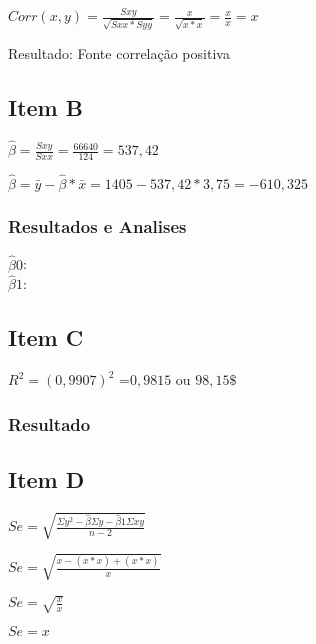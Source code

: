 \documentclass{article}
\begin{document}
\begin{flushleft}
    $Corr(x,y) = \frac{Sxy}{\sqrt{Sxx * Syy}} = \frac{x}{\sqrt{x * x}} = \frac{x}{x} = x $

\end{flushleft}

Resultado: Fonte correlação positiva

\subsection{Item B}

\begin{flushleft}

    $\hat{\beta} = \frac{Sxy}{Sxx} = \frac{66640}{124} = 537,42$

    $\hat{\beta} = \bar{y} - \hat{\beta} * \bar{x} = 1405 -537,42 * 3,75 = -610,325$
\end{flushleft}

\subsubsection{Resultados e Analises}

$\hat{\beta}0 $:  \\    
$\hat{\beta}1 $: 

\subsection{Item C}

\begin{flushleft}
    $R^2 = (0,9907)^2$ =$0,9815$ ou $98,15\$$
\end{flushleft}

\subsubsection{Resultado}


\subsection{Item D}
\begin{flushleft}
$Se = \sqrt{ \frac{\Sigma y^2 - \hat{\beta } \Sigma y - \hat{\beta}1 \Sigma xy }{n-2}}$
\end{flushleft}   

\begin{flushleft}
$Se = \sqrt{ \frac{x - (x * x)+ (x * x) }{x}}$

$Se = \sqrt{ \frac{x }{x}}$

$Se = x$
\end{flushleft}   
\end{document}
